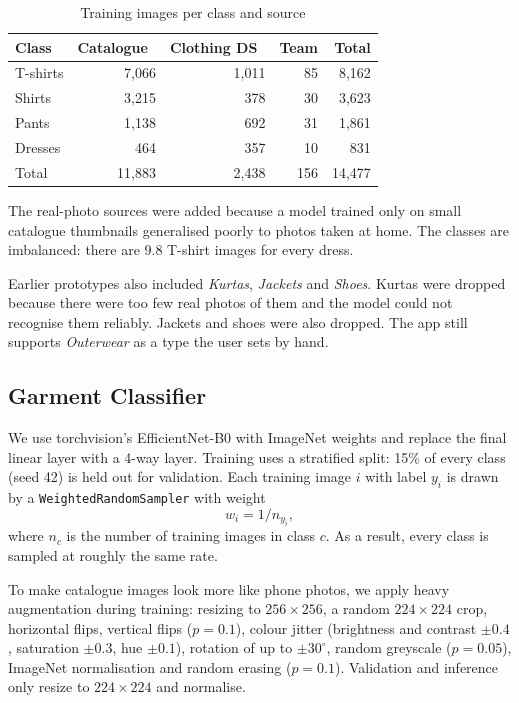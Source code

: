 \documentclass[conference]{IEEEtran}
\begin{document}
\begin{table}[t]
\caption{Training images per class and source}
\label{tab:data}
\centering
\begin{tabular}{lrrrr}
\toprule
Class & Catalogue~\cite{kaggleFashion} & Clothing DS~\cite{grigorev2020clothing} & Team & Total \\
\midrule
T-shirts & 7{,}066 & 1{,}011 & 85 & 8{,}162 \\
Shirts   & 3{,}215 &   378   & 30 & 3{,}623 \\
Pants    & 1{,}138 &   692   & 31 & 1{,}861 \\
Dresses  &   464   &   357   & 10 &   831   \\
\midrule
Total    & 11{,}883 & 2{,}438 & 156 & 14{,}477 \\
\bottomrule
\end{tabular}
\end{table}

The real-photo sources were added because a model trained only on small catalogue thumbnails generalised poorly to photos taken at home. The classes are imbalanced: there are 9.8 T-shirt images for every dress.

Earlier prototypes also included \emph{Kurtas}, \emph{Jackets} and \emph{Shoes}. Kurtas were dropped because there were too few real photos of them and the model could not recognise them reliably. Jackets and shoes were also dropped. The app still supports \emph{Outerwear} as a type the user sets by hand.

\subsection{Garment Classifier}\label{sec:cls}
We use torchvision's EfficientNet-B0 with ImageNet weights and replace the final linear layer with a 4-way layer. Training uses a stratified split: 15\% of every class (seed 42) is held out for validation. Each training image $i$ with label $y_i$ is drawn by a \texttt{WeightedRandomSampler} with weight
\begin{equation}
  w_i = 1 / n_{y_i},
\end{equation}
where $n_c$ is the number of training images in class $c$. As a result, every class is sampled at roughly the same rate.

To make catalogue images look more like phone photos, we apply heavy augmentation during training: resizing to $256{\times}256$, a random $224{\times}224$ crop, horizontal flips, vertical flips ($p{=}0.1$), colour jitter (brightness and contrast $\pm0.4$, saturation $\pm0.3$, hue $\pm0.1$), rotation of up to $\pm30^\circ$, random greyscale ($p{=}0.05$), ImageNet normalisation and random erasing ($p{=}0.1$). Validation and inference only resize to $224{\times}224$ and normalise.
\end{document}
